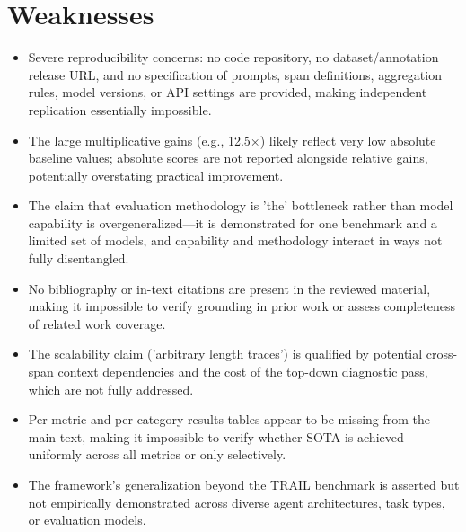 \documentclass[11pt]{article}
\begin{document}
\section*{Weaknesses}
\begin{itemize}[leftmargin=*]
  \item Severe reproducibility concerns: no code repository, no dataset/annotation release URL, and no specification of prompts, span definitions, aggregation rules, model versions, or API settings are provided, making independent replication essentially impossible.
  \item The large multiplicative gains (e.g., 12.5×) likely reflect very low absolute baseline values; absolute scores are not reported alongside relative gains, potentially overstating practical improvement.
  \item The claim that evaluation methodology is 'the' bottleneck rather than model capability is overgeneralized—it is demonstrated for one benchmark and a limited set of models, and capability and methodology interact in ways not fully disentangled.
  \item No bibliography or in-text citations are present in the reviewed material, making it impossible to verify grounding in prior work or assess completeness of related work coverage.
  \item The scalability claim ('arbitrary length traces') is qualified by potential cross-span context dependencies and the cost of the top-down diagnostic pass, which are not fully addressed.
  \item Per-metric and per-category results tables appear to be missing from the main text, making it impossible to verify whether SOTA is achieved uniformly across all metrics or only selectively.
  \item The framework's generalization beyond the TRAIL benchmark is asserted but not empirically demonstrated across diverse agent architectures, task types, or evaluation models.
\end{itemize}
\end{document}
